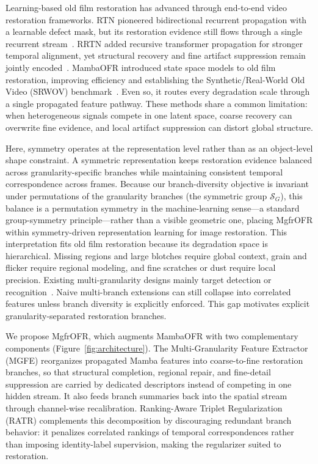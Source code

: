 Learning-based old film restoration has advanced through end-to-end video restoration frameworks. RTN pioneered bidirectional recurrent propagation with a learnable defect mask, but its restoration evidence still flows through a single recurrent stream~\cite{wan2022rtn}. RRTN added recursive transformer propagation for stronger temporal alignment, yet structural recovery and fine artifact suppression remain jointly encoded~\cite{lin2024rrtn}. MambaOFR introduced state space models to old film restoration, improving efficiency and establishing the Synthetic/Real-World Old Video (SRWOV) benchmark~\cite{mao2025mambaofr,gu2024mamba,guo2024mambair}. Even so, it routes every degradation scale through a single propagated feature pathway. These methods share a common limitation: when heterogeneous signals compete in one latent space, coarse recovery can overwrite fine evidence, and local artifact suppression can distort global structure.

Here, symmetry operates at the representation level rather than as an object-level shape constraint. A symmetric representation keeps restoration evidence balanced across granularity-specific branches while maintaining consistent temporal correspondence across frames. Because our branch-diversity objective is invariant under permutations of the granularity branches (the symmetric group $\mathcal{S}_G$), this balance is a permutation symmetry in the machine-learning sense---a standard group-symmetry principle---rather than a visible geometric one, placing MgfrOFR within symmetry-driven representation learning for image restoration. This interpretation fits old film restoration because its degradation space is hierarchical. Missing regions and large blotches require global context, grain and flicker require regional modeling, and fine scratches or dust require local precision. Existing multi-granularity designs mainly target detection or recognition~\cite{lin2017fpn,wang2021hrnet,sun2018pcb,wang2018mgn,gu2025reidmamba}. Naive multi-branch extensions can still collapse into correlated features unless branch diversity is explicitly enforced. This gap motivates explicit granularity-separated restoration branches.

We propose MgfrOFR, which augments MambaOFR with two complementary components (Figure~\ref{fig:architecture}). The Multi-Granularity Feature Extractor (MGFE) reorganizes propagated Mamba features into coarse-to-fine restoration branches, so that structural completion, regional repair, and fine-detail suppression are carried by dedicated descriptors instead of competing in one hidden stream. It also feeds branch summaries back into the spatial stream through channel-wise recalibration. Ranking-Aware Triplet Regularization (RATR) complements this decomposition by discouraging redundant branch behavior: it penalizes correlated rankings of temporal correspondences rather than imposing identity-label supervision, making the regularizer suited to restoration.

